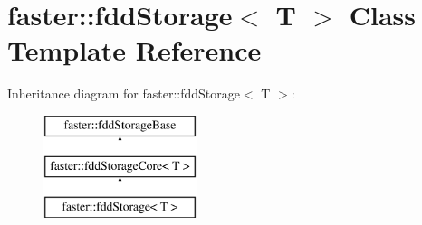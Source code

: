 \hypertarget{classfaster_1_1fddStorage}{}\section{faster\+:\+:fdd\+Storage$<$ T $>$ Class Template Reference}
\label{classfaster_1_1fddStorage}
Inheritance diagram for faster\+:\+:fdd\+Storage$<$ T $>$\+:\begin{figure}[H]
\begin{center}
\leavevmode
\includegraphics[height=3.000000cm]{classfaster_1_1fddStorage}
\end{center}
\end{figure}

